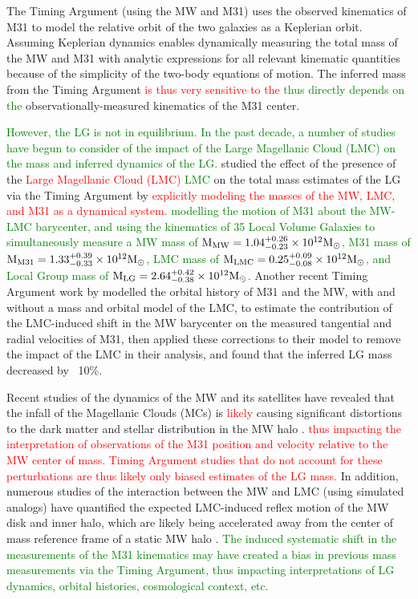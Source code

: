 \documentclass[twocolumn]{aastex631}
\newcommand{\remove}[1]{\textcolor{red}{#1}}
\newcommand{\add}[1]{\textcolor{green}{#1}}
\begin{document}
The Timing Argument (using the MW and M31) uses the observed kinematics of M31
to model the relative orbit of the two galaxies as a Keplerian orbit.
Assuming Keplerian dynamics enables dynamically measuring the total mass of the
MW and M31 with analytic expressions for all relevant kinematic quantities
because of the simplicity of the two-body equations of motion.
The inferred mass from the Timing Argument \remove{is thus very sensitive to
the} \add{thus directly depends on the} observationally-measured kinematics
of the M31 center.

\add{However, the LG is not in equilibrium.
In the past decade, a number of studies have begun to consider of the
impact of the Large Magellanic Cloud (LMC) on the mass and inferred
dynamics of the LG.}
\citet{Penarrubia2016} studied the effect of the presence of the
\remove{Large Magellanic Cloud (LMC)}
\add{LMC} on the total mass estimates of the LG via the Timing Argument by
\remove{explicitly modeling the masses of the MW, LMC, and M31 as a dynamical system.}
\add{modelling the motion of M31 about the MW-LMC barycenter, and using the
kinematics of 35 Local Volume Galaxies to simultaneously measure
a MW mass of $\rm M_{MW} = 1.04^{+0.26}_{-0.23}\times 10^{12} M_\odot$,
M31 mass of $\rm M_{M31} = 1.33^{+0.39}_{-0.33}\times 10^{12} M_\odot$,
LMC mass of $\rm M_{LMC} = 0.25^{+0.09}_{-0.08}\times 10^{12} M_\odot$,
and Local Group mass of $\rm M_{LG} = 2.64^{+0.42}_{-0.38}\times 10^{12}
M_\odot$.}
Another recent Timing Argument work by \cite{Benisty2022} modelled the orbital
history of M31 and the MW, with and without a mass and orbital model of the LMC,
to estimate the contribution of the LMC-induced shift in the MW barycenter on
the measured tangential and radial velocities of M31, then applied these
corrections to their model to remove the impact of the LMC in their analysis,
and found that the inferred LG mass decreased by ~10\%.

Recent studies of the dynamics of the MW and its satellites have
revealed that the infall of the Magellanic Clouds (MCs) is \remove{likely}
causing significant distortions to the dark matter and stellar distribution in
the MW halo \citep{Laporte:2018a, Laporte:2018b, Garavito-Camargo:2019,
Conroy:2021, Erkal:2021}.
\remove{thus impacting the interpretation of observations of the M31 position
and velocity relative to the MW center of mass. Timing Argument studies that do
not account for these perturbations are thus likely only biased estimates of the
LG mass.}
In addition, numerous studies of the interaction between the MW and LMC (using
simulated analogs) have quantified the expected LMC-induced reflex motion of the
MW disk and inner halo, which are likely being accelerated away from the center
of mass reference frame of a static MW halo \citep{Gomez2015, Cunningham:2020,
Petersen:2020, Garavito-Camargo2021b}.
\add{The induced systematic
shift in the measurements of the M31 kinematics may have created a bias in
previous mass measurements via the Timing Argument, thus
impacting interpretations of LG dynamics, orbital histories, cosmological
context, etc.}
\end{document}
